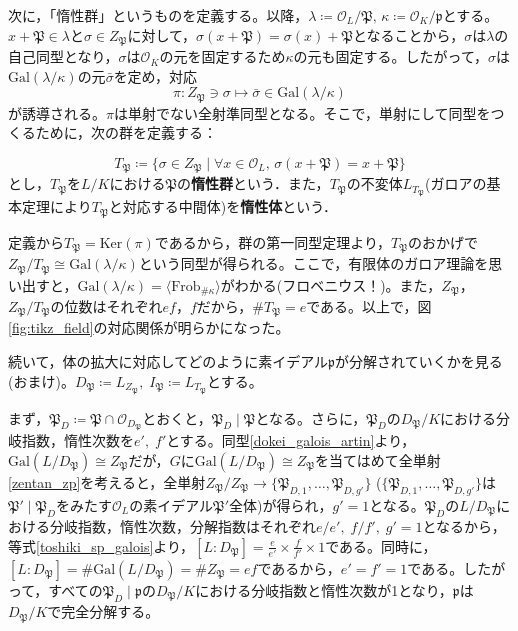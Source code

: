 次に，「惰性群」というものを定義する。以降，$\lambda\coloneq\mathcal{O}_L/{\mathfrak{P}},\,\kappa\coloneq\mathcal{O}_K/{\mathfrak{p}}$とする。$x+\mathfrak{P}\in\lambda$と$\sigma\in Z_{\mathfrak{P}}$に対して，$\sigma(x+\mathfrak{P})=\sigma(x)+\mathfrak{P}$となることから，$\sigma$は$\lambda$の自己同型となり，$\sigma$は$\mathcal{O}_K$の元を固定するため$\kappa$の元も固定する。したがって，$\sigma$は$\mathrm{Gal}(\lambda/{\kappa})$の元$\bar{\sigma}$を定め，対応\[
\pi:Z_{\mathfrak{P}}\ni\sigma\mapsto\bar{\sigma}\in\mathrm{Gal}(\lambda/\kappa)
\]が誘導される。$\pi$は単射でない全射準同型となる。そこで，単射にして同型をつくるために，次の群を定義する：
\begin{dfn}
    \[
    T_{\mathfrak{P}}\coloneqq\{\sigma\in Z_{\mathfrak{P}}\mid\forall x\in\mathcal{O}_L,\,\sigma(x+\mathfrak{P})=x+\mathfrak{P}\}
    \]とし，$T_{\mathfrak{P}}$を$L/K$における$\mathfrak{P}$の\textbf{惰性群}という．また，$T_{\mathfrak{P}}$の不変体$L_{T_{\mathfrak{P}}}$(ガロアの基本定理により$T_{\mathfrak{P}}$と対応する中間体)を\textbf{惰性体}という．
\end{dfn}
定義から$T_{\mathfrak{P}}=\mathrm{Ker}(\pi)$であるから，群の第一同型定理より，$T_{\mathfrak{P}}$のおかげで$Z_{\mathfrak{P}}/{T_{\mathfrak{P}}}\cong\mathrm{Gal}(\lambda/\kappa)$という同型が得られる。ここで，有限体のガロア理論を思い出すと，$\mathrm{Gal}(\lambda/\kappa)=\langle\mathrm{Frob}_{\#\kappa}\rangle$がわかる(フロベニウス！)。また，$Z_{\mathfrak{P}}$，$Z_{\mathfrak{P}}/{T_{\mathfrak{P}}}$の位数はそれぞれ$ef$，$f$だから，$\# T_{\mathfrak{P}}=e$である。以上で，図\ref{fig:tikz_field}の対応関係が明らかになった。

続いて，体の拡大に対応してどのように素イデアル$\mathfrak{p}$が分解されていくかを見る(おまけ)。$D_{\mathfrak{P}}\coloneqq L_{Z_{\mathfrak{P}}},\; I_{\mathfrak{P}}\coloneqq L_{T_{\mathfrak{P}}}$とする。

まず，$\mathfrak{P}_D\coloneqq\mathfrak{P}\cap\mathcal{O}_{D_{\mathfrak{P}}}$とおくと，$\mathfrak{P}_D\mid\mathfrak{P}$となる。さらに，$\mathfrak{P}_D$の$D_{\mathfrak{P}}/K$における分岐指数，惰性次数を$e',\; f'$とする。同型\eqref{dokei_galois_artin}より，$\mathrm{Gal}(L/D_{\mathfrak{P}})\cong Z_{\mathfrak{P}}$だが，$G$に$\mathrm{Gal}(L/D_{\mathfrak{P}})\cong Z_{\mathfrak{P}}$を当てはめて全単射\eqref{zentan_zp}を考えると，全単射$Z_{\mathfrak{P}}/Z_\mathfrak{P}\rightarrow\{\mathfrak{P}_{D,1},\ldots,\mathfrak{P}_{D,g'}\}$\; ($\{\mathfrak{P}_{D,1},\ldots,\mathfrak{P}_{D,g'}\}$は$\mathfrak{P'}\mid\mathfrak{P}_D$をみたす$\mathcal{O}_L$の素イデアル$\mathfrak{P'}$全体)が得られ，$g'=1$となる。$\mathfrak{P}_D$の$L/{D_{\mathfrak{P}}}$における分岐指数，惰性次数，分解指数はそれぞれ$e/e',\; f/f',\; g'=1$となるから，等式\eqref{toshiki_sp_galois}より，$[L:D_{\mathfrak{P}}]=\frac{e}{e'}\times\frac{f}{f'}\times 1$である。同時に，$[L:D_{\mathfrak{P}}]=\#\mathrm{Gal}(L/D_{\mathfrak{P}})=\# Z_{\mathfrak{P}}=ef$であるから，$e'=f'=1$である。したがって，すべての$\mathfrak{P}_D\mid\mathfrak{p}$の$D_{\mathfrak{P}}/K$における分岐指数と惰性次数が1となり，$\mathfrak{p}$は$D_{\mathfrak{P}}/K$で完全分解する。

